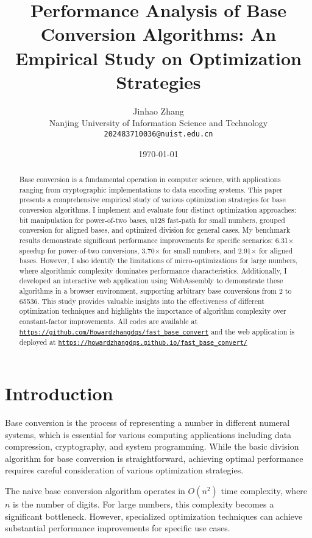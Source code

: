 \documentclass[10pt]{article}
\title{Performance Analysis of Base Conversion Algorithms: An Empirical Study on Optimization Strategies}
\author{
  \begin{tabular}{c}
    Jinhao Zhang \\
    Nanjing University of Information Science and Technology  \\
    \texttt{202483710036@nuist.edu.cn}
  \end{tabular}
}
\date{\today}
\begin{document}
\maketitle

\begin{abstract}
Base conversion is a fundamental operation in computer science, with applications ranging from cryptographic implementations to data encoding systems. This paper presents a comprehensive empirical study of various optimization strategies for base conversion algorithms. I implement and evaluate four distinct optimization approaches: bit manipulation for power-of-two bases, u128 fast-path for small numbers, grouped conversion for aligned bases, and optimized division for general cases. My benchmark results demonstrate significant performance improvements for specific scenarios: 6.31× speedup for power-of-two conversions, 3.70× for small numbers, and 2.91× for aligned bases. However, I also identify the limitations of micro-optimizations for large numbers, where algorithmic complexity dominates performance characteristics. Additionally, I developed an interactive web application using WebAssembly to demonstrate these algorithms in a browser environment, supporting arbitrary base conversions from 2 to 65536. This study provides valuable insights into the effectiveness of different optimization techniques and highlights the importance of algorithm complexity over constant-factor improvements. All codes are available at \href{https://github.com/Howardzhangdqs/fast_base_convert}{\texttt{https://github.com/Howardzhangdqs/fast\_base\_convert}} and the web application is deployed at \href{https://howardzhangdqs.github.io/fast_base_convert/}{\texttt{https://howardzhangdqs.github.io/fast\_base\_convert/}}
\end{abstract}

\section{Introduction}

Base conversion is the process of representing a number in different numeral systems, which is essential for various computing applications including data compression, cryptography, and system programming. While the basic division algorithm for base conversion is straightforward, achieving optimal performance requires careful consideration of various optimization strategies.

The naive base conversion algorithm operates in $O(n^2)$ time complexity, where $n$ is the number of digits. For large numbers, this complexity becomes a significant bottleneck. However, specialized optimization techniques can achieve substantial performance improvements for specific use cases.
\end{document}
